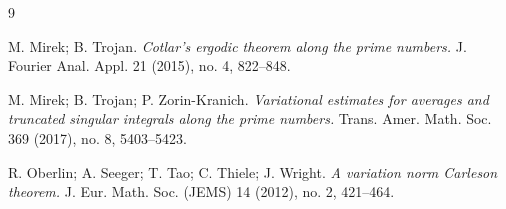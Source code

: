 \documentclass[12pt]{amsart}
\numberwithin{equation}{section}
\theoremstyle{definition}
\begin{document}
\begin{thebibliography}{9}







M. Mirek; B. Trojan. \emph{Cotlar's ergodic theorem along the prime numbers.}
J. Fourier Anal. Appl. 21 (2015), no. 4, 822–848.

M. Mirek; B. Trojan; P. Zorin-Kranich.
\emph{
Variational estimates for averages and truncated singular integrals along the prime numbers.}
Trans. Amer. Math. Soc. 369 (2017), no. 8, 5403–5423.

R. Oberlin; A. Seeger; T. Tao; C. Thiele; J. Wright. \emph{
A variation norm Carleson theorem.}
J. Eur. Math. Soc. (JEMS) 14 (2012), no. 2, 421–464.










\end{thebibliography}
\end{document}
